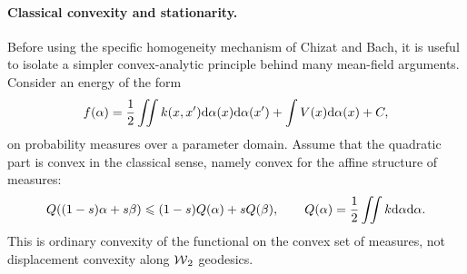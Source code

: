 \paragraph{Classical convexity and stationarity.}
Before using the specific homogeneity mechanism of Chizat and Bach, it is useful to isolate a simpler convex-analytic principle behind many mean-field arguments. Consider an energy of the form
\[
	f(\alpha)
	=
	\frac12\iint k(x,x')\mathrm{d}\alpha(x)\mathrm{d}\alpha(x')
	+
	\int V(x)\mathrm{d}\alpha(x)
	+C,
\]
on probability measures over a parameter domain. Assume that the quadratic part is convex in the classical sense, namely convex for the affine structure of measures:
\[
	Q((1-s)\alpha+s\beta)\leqslant (1-s)Q(\alpha)+sQ(\beta),
	\qquad
	Q(\alpha)=\frac12\iint k\mathrm{d}\alpha\mathrm{d}\alpha.
\]
This is ordinary convexity of the functional on the convex set of measures, not displacement convexity along $\operatorname{\mathcal{W}}_2$ geodesics.

